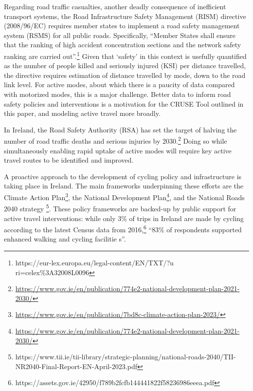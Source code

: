 \documentclass[
  super,
  preprint,
  3p]{elsarticle}
\begin{document}
Regarding road traffic casualties, another deadly consequence of
inefficient transport systems, the Road Infrastructure Safety Management
(RISM) directive (2008/96/EC) requires member states to implement a road
safety management system (RSMS) for all public roads. Specifically,
``Member States shall ensure that the ranking of high accident
concentration sections and the network safety ranking are carried
out''.\footnote{https://eur-lex.europa.eu/legal-content/EN/TXT/?u
  ri=celex\%3A32008L0096} Given that `safety' in this context is
usefully quantified as the number of people killed and seriously injured
(KSI) per distance travelled, the directive requires estimation of
distance travelled by mode, down to the road link level. For active
modes, about which there is a paucity of data compared with motorized
modes, this is a major challenge. Better data to inform road safety
policies and interventions is a motivation for the CRUSE Tool outlined
in this paper, and modeling active travel more broadly.

In Ireland, the Road Safety Authority (RSA) has set the target of
halving the number of road traffic deaths and serious injuries by
2030.\footnote{\url{https://www.gov.ie/en/publication/774e2-national-development-plan-2021-2030/}}
Doing so while simultaneously enabling rapid uptake of active modes will
require key active travel routes to be identified and improved.

A proactive approach to the development of cycling policy and
infrastructure is taking place in Ireland. The main frameworks
underpinning these efforts are the Climate Action Plan\footnote{\url{https://www.gov.ie/en/publication/7bd8c-climate-action-plan-2023/}},
the National Development Plan\footnote{\url{https://www.gov.ie/en/publication/774e2-national-development-plan-2021-2030/}},
and the National Roads 2040 strategy \footnote{https://www.tii.ie/tii-library/strategic-planning/national-roads-2040/TII-NR2040-Final-Report-EN-April-2023.pdf}.
These policy frameworks are backed-up by public support for active
travel interventions: while only 3\% of trips in Ireland are made by
cycling according to the latest Census data from 2016,\footnote{https://assets.gov.ie/42950/f789b2fcfb144441822f58236986eeea.pdf}
``83\% of respondents supported enhanced walking and cycling facilitie
s''.
\end{document}
